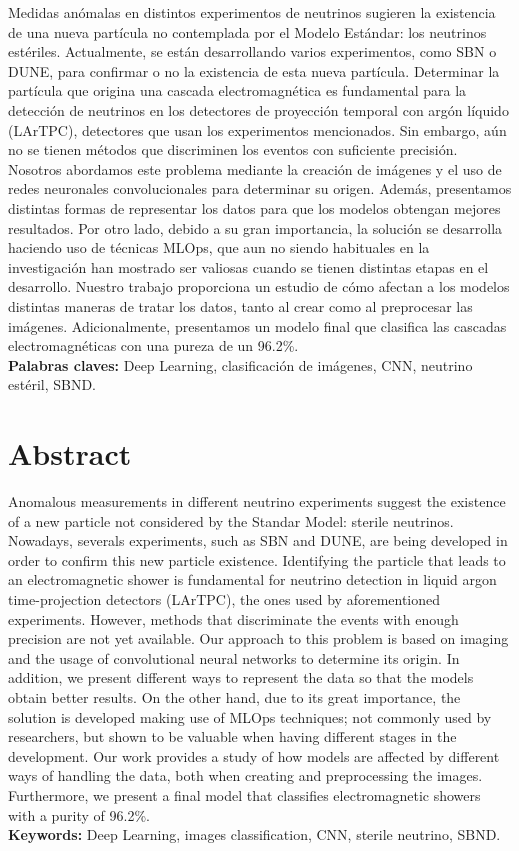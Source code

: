 \documentclass[a4paper,12pt,oneside,titlepage]{book}
\begin{document}
Medidas anómalas en distintos experimentos de neutrinos sugieren la existencia de una nueva partícula no contemplada por el Modelo Estándar: los neutrinos estériles. Actualmente, se están desarrollando varios experimentos, como SBN o DUNE, para confirmar o no la existencia de esta nueva partícula. Determinar la partícula que origina una cascada electromagnética es fundamental para la detección de neutrinos en los detectores de proyección temporal con argón líquido (LArTPC), detectores que usan los experimentos mencionados. Sin embargo, aún no se tienen métodos que discriminen los eventos con suficiente precisión. Nosotros abordamos este problema mediante la creación de imágenes y el uso de redes neuronales convolucionales para determinar su origen. Además, presentamos distintas formas de representar los datos para que los modelos obtengan mejores resultados. Por otro lado, debido a su gran importancia, la solución se desarrolla haciendo uso de técnicas MLOps, que aun no siendo habituales en la investigación han mostrado ser valiosas cuando se tienen distintas etapas en el desarrollo. Nuestro trabajo proporciona un estudio de cómo afectan a los modelos distintas maneras de tratar los datos, tanto al crear como al preprocesar las imágenes. Adicionalmente, presentamos un modelo final que clasifica las cascadas electromagnéticas con una pureza de un 96.2\%.
\\
\textbf{Palabras claves:} Deep Learning, clasificación de imágenes, CNN, neutrino estéril, SBND.


\newpage
\section*{Abstract}
Anomalous measurements in different neutrino experiments suggest the existence of a new particle not considered by the Standar Model: sterile neutrinos. Nowadays, severals experiments, such as SBN and DUNE, are being developed in order to confirm this new particle existence. Identifying the particle that leads to an electromagnetic shower is fundamental for neutrino detection in liquid argon time-projection detectors (LArTPC), the ones used by aforementioned experiments. However, methods that discriminate the events with enough precision are not yet available. Our approach to this problem is based on imaging and the usage of convolutional neural networks to determine its origin. In addition, we present different ways to represent the data so that the models obtain better results. On the other hand, due to its great importance, the solution is developed making use of MLOps techniques; not commonly used by researchers, but shown to be valuable when having different stages in the development. Our work provides a study of how models are affected by different ways of handling the data, both when creating and preprocessing the images. Furthermore, we present a final model that classifies electromagnetic showers with a purity of 96.2\%.
\\
\textbf{Keywords:} Deep Learning, images classification, CNN, sterile neutrino, SBND.
\end{document}
